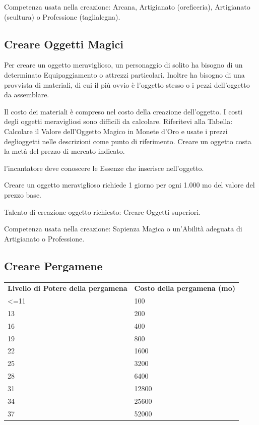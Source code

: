 \documentclass[a4paper,11pt,twoside,openany]{book}
\begin{document}
Competenza usata nella creazione: Arcana, Artigianato (oreficeria), Artigianato (scultura) o Professione (taglialegna).

\pagebreak

\subsection{Creare Oggetti Magici}

Per creare un oggetto meraviglioso, un personaggio di solito ha bisogno di un determinato Equipaggiamento o attrezzi particolari. Inoltre ha bisogno di una provvista di materiali, di cui il più ovvio è l'oggetto stesso o i pezzi dell'oggetto da assemblare.

Il costo dei materiali è compreso nel costo della creazione dell'oggetto. I costi degli oggetti meravigliosi sono difficili da calcolare. Riferitevi alla Tabella: Calcolare il Valore dell'Oggetto Magico in Monete d'Oro e usate i prezzi deglioggetti nelle descrizioni come punto di riferimento. Creare un oggetto costa la metà del prezzo di mercato indicato.

l'incantatore deve conoscere le Essenze che inserisce nell'oggetto.

Creare un oggetto meraviglioso richiede 1 giorno per ogni 1.000 mo del valore del prezzo base.

Talento di creazione oggetto richiesto: Creare Oggetti superiori.

Competenza usata nella creazione: Sapienza Magica o un'Abilità adeguata
di Artigianato o Professione.

\subsection{Creare Pergamene}

\begin{tabular}{ll}
	\toprule
	\textbf{Livello di Potere della pergamena} & \textbf{Costo della pergamena (mo)}\tabularnewline
	\textless=11                               & 100\tabularnewline
	13                                         & 200\tabularnewline
	16                                         & 400\tabularnewline
	19                                         & 800\tabularnewline
	22                                         & 1600\tabularnewline
	25                                         & 3200\tabularnewline
	28                                         & 6400\tabularnewline
	31                                         & 12800\tabularnewline
	34                                         & 25600\tabularnewline
	37                                         & 52000\tabularnewline
\end{tabular}
\end{document}
